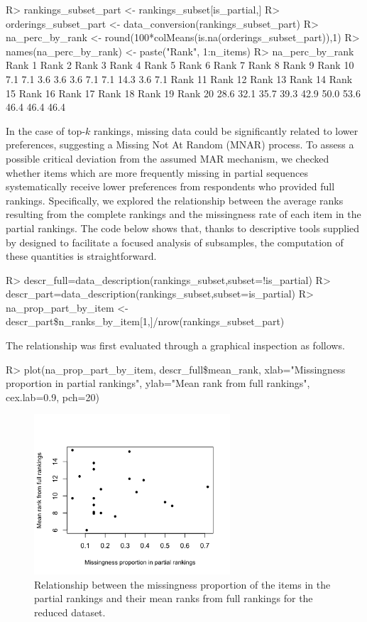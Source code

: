 \begin{example*}
R> rankings\_subset\_part <- rankings\_subset[is\_partial,]
R> orderings\_subset\_part <- data\_conversion(rankings\_subset\_part)
R> na\_perc\_by\_rank <- round(100*colMeans(is.na(orderings\_subset\_part)),1)
R> names(na\_perc\_by\_rank) <- paste("Rank", 1:n\_items)
R> na\_perc\_by\_rank
 Rank 1  Rank 2  Rank 3  Rank 4  Rank 5  Rank 6  Rank 7  Rank 8  Rank 9 Rank 10
    7.1     7.1     3.6     3.6     3.6     7.1     7.1    14.3     3.6     7.1
Rank 11 Rank 12 Rank 13 Rank 14 Rank 15 Rank 16 Rank 17 Rank 18 Rank 19 Rank 20
   28.6    32.1    35.7    39.3    42.9    50.0    53.6    46.4    46.4    46.4
\end{example*}


In the case of top-$k$ rankings, missing data could be significantly related to lower preferences, suggesting a Missing Not At Random (MNAR) process. To assess
a possible critical deviation from the assumed MAR mechanism, we checked whether items which are more frequently missing in partial sequences systematically receive lower preferences from respondents who provided full rankings. Specifically, we explored the relationship between the average ranks resulting from the complete rankings and the missingness rate of each item in the partial rankings. The code below shows that, thanks to descriptive tools supplied by  designed to facilitate a focused analysis of subsamples, the computation of these quantities is straightforward.
%
\begin{example*}
R> descr\_full=data\_description(rankings\_subset,subset=!is\_partial)
R> descr\_part=data\_description(rankings\_subset,subset=is\_partial)
R> na\_prop\_part\_by\_item <- descr\_part\$n\_ranks\_by\_item[1,]/nrow(rankings\_subset\_part)
\end{example*}
%
The relationship was first evaluated through a graphical inspection as follows.
%
\begin{example*}
R> plot(na\_prop\_part\_by\_item, descr\_full\$mean\_rank,
     xlab="Missingness proportion in partial rankings",
     ylab="Mean rank from full rankings",
     cex.lab=0.9, pch=20)
\end{example*}
%
\begin{figure}[t]
     \centering
     \includegraphics[width=0.65\textwidth]{figures/RJ2025_paper_scatter_beers.png}
      \caption{Relationship between the missingness proportion of the items in the partial rankings and their mean ranks from full rankings for the reduced  dataset.}
     \label{fig:scat_beers}
\end{figure}
